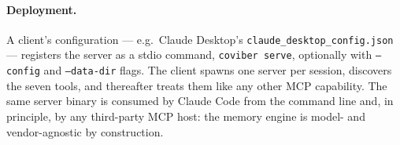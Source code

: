 \paragraph{Deployment.}
A client's configuration --- e.g.\ Claude Desktop's \texttt{claude\_desktop\_config.json} --- registers the server as a stdio command, \texttt{coviber serve}, optionally with \texttt{--config} and \texttt{--data-dir} flags. The client spawns one server per session, discovers the seven tools, and thereafter treats them like any other MCP capability. The same server binary is consumed by Claude Code from the command line and, in principle, by any third-party MCP host: the memory engine is model- and vendor-agnostic by construction.
